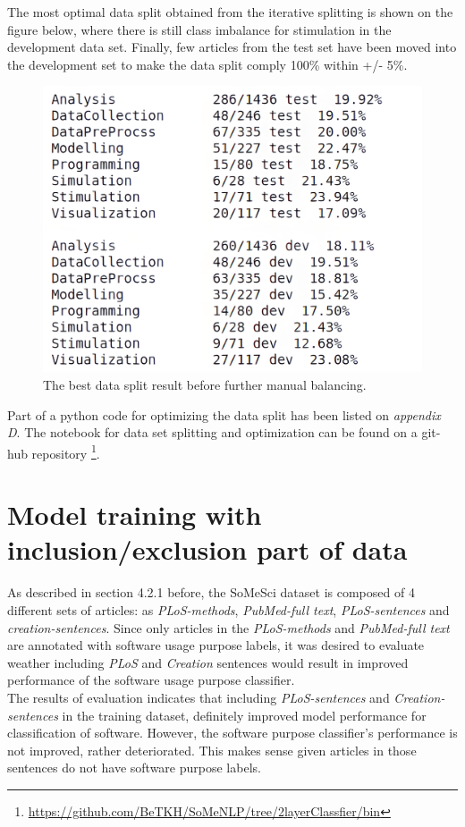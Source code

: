 The most optimal data split obtained from the iterative splitting is shown on the figure below, where there is still class imbalance for stimulation in the development data set. Finally, few articles from the test set have been moved into the development set to make the data split comply 100\% within +/- 5\%. \\

\begin{figure}[htbp]
	\centering
	\includegraphics[width=.55\textwidth]{4.graphics/figures/ch_6/optimal_split_sofar}
	\caption{The best data split result before further manual balancing.}
	\label{fig:chapter04:setup}
\end{figure}

Part of a python code for optimizing the data split has been listed on \emph{appendix D}. The notebook for data set splitting and optimization can be found on a git-hub repository  \footnote{\url{https://github.com/BeTKH/SoMeNLP/tree/2layerClassfier/bin}}. 

\section{Model training with inclusion/exclusion part of data}
\label{sec:chapter06:exclusion}

As described in section 4.2.1 before, the SoMeSci dataset is composed of 4 different sets of articles: as \emph{PLoS-methods}, \emph{PubMed-full text}, \emph{ PLoS-sentences} and \emph{creation-sentences}. Since only articles in the  \emph{PLoS-methods} and \emph{PubMed-full text} are annotated with software usage purpose labels, it was desired to evaluate weather including \emph{PLoS} and \emph{Creation} sentences would result in improved performance of the software usage purpose classifier.   \\

The results of evaluation indicates that including \emph{PLoS-sentences} and \emph{Creation-sentences} in the training dataset, definitely improved model performance for classification of software. However, the software purpose classifier’s performance is not improved, rather deteriorated. This makes sense given articles in those sentences do not have software purpose labels. \\

